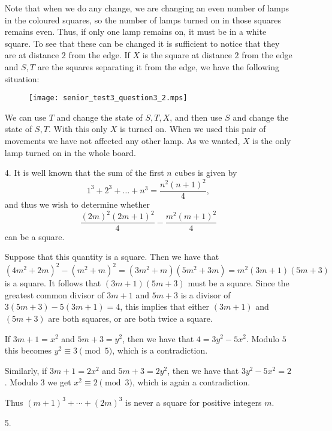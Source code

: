 \documentclass[a4paper, 12pt]{article}
\begin{document}
\begin{enumerate}
Note that when we do any change, we are changing an even number of lamps in the coloured squares, so the number of lamps turned on in those squares remains even. Thus, if only one lamp remains on, it must be in a white square. To see that these can be changed it is sufficient to notice that they are at distance $2$ from the edge. If $X$ is the square at distance $2$ from the edge and $S, T$ are the squares separating it from the edge, we have the following situation:

\begin{figure}[H]
\centering
\texttt{[image: senior\_test3\_question3\_2.mps]}
\end{figure}

We can use $T$ and change the state of $S, T, X$, and then use $S$ and change the state of $S, T$. With this only $X$ is turned on. When we used this pair of movements we have not affected any other lamp. As we wanted, $X$ is the only lamp turned on in the whole board.

\item[4.]
It is well known that the sum of the first $n$ cubes is given by
\[
	1^3 + 2^3 + \dots + n^3 = \frac{n^2 {(n + 1)}^2}{4},
\]
and thus we wish to determine whether
\[
	\frac{{(2m)}^2 {(2m + 1)}^2}{4} - \frac{m^2 {(m + 1)}^2}{4}
\]
can be a square.

Suppose that this quantity is a square. Then we have that
\[
	{(4m^2 + 2m)}^2 - {(m^2 + m)}^2 = (3m^2 + m)(5m^2 + 3m) = m^2 (3m + 1)(5m + 3)
\]
is a square. It follows that $(3m + 1)(5m + 3)$ must be a square. Since the greatest common divisor of $3m + 1$ and $5m + 3$ is a divisor of $3(5m + 3) - 5(3m + 1) = 4$, this implies that either $(3m + 1)$ and $(5m + 3)$ are both squares, or are both twice a square.

If $3m + 1 = x^2$ and $5m + 3 = y^2$, then we have that $4 = 3y^2 - 5x^2$. Modulo $5$ this becomes $y^2 \equiv 3 \pmod 5$, which is a contradiction.

Similarly, if $3m + 1 = 2x^2$ and $5m + 3 = 2y^2$, then we have that $3y^2 - 5x^2 = 2$. Modulo $3$ we get $x^2 \equiv 2 \pmod 3$, which is again a contradiction.

Thus ${(m + 1)}^3 + \cdots + {(2m)}^3$ is never a square for positive integers $m$.

\item[5.]

\end{enumerate}
\end{document}
